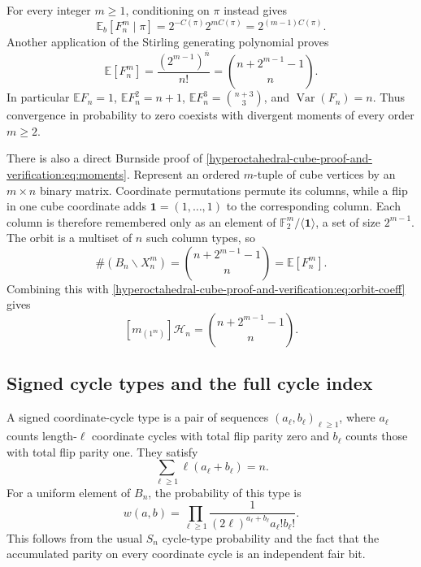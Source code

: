 \documentclass[10pt]{article}
\newcommand{\F}{\mathbb F}
\newcommand{\E}{\mathbb E}
\begin{document}
For every integer $m\geq1$, conditioning on $\pi$ instead gives
\[
\E_b[F_n^m\mid\pi]
=2^{-C(\pi)}2^{mC(\pi)}=2^{(m-1)C(\pi)}.
\]
Another application of the Stirling generating polynomial proves
\begin{equation}\label{hyperoctahedral-cube-proof-and-verification:eq:moments}
\boxed{\quad
\E[F_n^m]
=\frac{(2^{m-1})^{\overline n}}{n!}
=\binom{n+2^{m-1}-1}{n}.
\quad}
\end{equation}
In particular $\E F_n=1$, $\E F_n^2=n+1$,
$\E F_n^3=\binom{n+3}{3}$, and $\operatorname{Var}(F_n)=n$.  Thus convergence
in probability to zero coexists with divergent moments of every order
$m\geq2$.

There is also a direct Burnside proof of \eqref{hyperoctahedral-cube-proof-and-verification:eq:moments}.  Represent an
ordered $m$-tuple of cube vertices by an $m\times n$ binary matrix.  Coordinate
permutations permute its columns, while a flip in one cube coordinate adds
$\mathbf1=(1,\ldots,1)$ to the corresponding column.  Each column is therefore
remembered only as an element of
$\F_2^m/\langle\mathbf1\rangle$, a set of size $2^{m-1}$.  The orbit is a
multiset of $n$ such column types, so
\[
\#(B_n\backslash X_n^m)=\binom{n+2^{m-1}-1}{n}=\E[F_n^m].
\]
Combining this with \eqref{hyperoctahedral-cube-proof-and-verification:eq:orbit-coeff} gives
\begin{equation}\label{hyperoctahedral-cube-proof-and-verification:eq:moment-coeff}
[m_{(1^m)}]\mathcal H_n=\binom{n+2^{m-1}-1}{n}.
\end{equation}

\subsection{Signed cycle types and the full cycle index}
A signed coordinate-cycle type is a pair of sequences
$(a_\ell,b_\ell)_{\ell\geq1}$, where $a_\ell$ counts length-$\ell$
coordinate cycles with total flip parity zero and $b_\ell$ counts those with
total flip parity one.  They satisfy
\[
\sum_{\ell\geq1}\ell(a_\ell+b_\ell)=n.
\]
For a uniform element of $B_n$, the probability of this type is
\begin{equation}\label{hyperoctahedral-cube-proof-and-verification:eq:type-probability}
w(a,b)=\prod_{\ell\geq1}
\frac1{(2\ell)^{a_\ell+b_\ell}a_\ell!b_\ell!}.
\end{equation}
This follows from the usual $S_n$ cycle-type probability and the fact that
the accumulated parity on every coordinate cycle is an independent fair bit.
\end{document}
